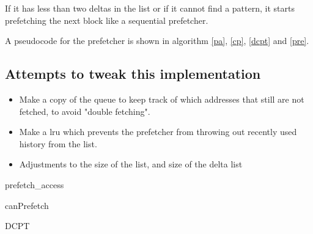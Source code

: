 \documentclass[12pt,journal,compsoc]{IEEEtran}
\begin{document}
If it has less than two deltas in the list or if it cannot find a pattern, it starts prefetching the next block like a sequential prefetcher.

A pseudocode for the prefetcher is shown in algorithm \ref{pa}, \ref{cp}, \ref{dcpt} and \ref{pre}.
\subsection{Attempts to tweak this implementation}
\begin{itemize}
\item Make a copy of the queue to keep track of which addresses that still are
not fetched, to avoid "double fetching".
\item Make a lru which prevents the prefetcher from throwing out recently used history from the list.
\item Adjustments to the size of the list, and size of the delta list
\end{itemize}

\begin{algorithm}
\dontprintsemicolon
{}

\caption{prefetch\_access\label{pa}}
\end{algorithm}

\begin{algorithm}
\dontprintsemicolon
{}

\caption{canPrefetch\label{cp}}
\end{algorithm}

\begin{algorithm}
\dontprintsemicolon
{}

\caption{DCPT\label{dcpt}}
\end{algorithm}
\end{document}
